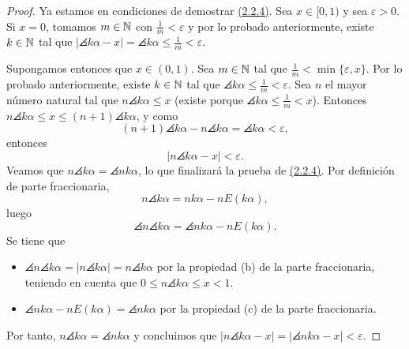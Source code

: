 \documentclass[a4paper, 12pt]{book}
\begin{document}
\begin{proof}
    Ya estamos en condiciones de demostrar \hyperref[2.2.4]{(2.2.4)}. Sea $x \in [0,1)$ y sea $\varepsilon > 0$. Si $x = 0$, tomamos $m \in \mathbb N$ con $\frac{1}{m}<\varepsilon$ y por lo probado anteriormente, existe $k \in \mathbb N$ tal que $|\angles{k\alpha}-x| = \angles{k\alpha}  \leq \frac{1}{m}< \varepsilon$.
    
    Supongamos entonces que $x \in (0,1)$. Sea $m \in \mathbb N$ tal que $\frac{1}{m} < \min\{\varepsilon,x\}$. Por lo probado anteriormente, existe $k \in \mathbb N$ tal que $\angles{k\alpha} \leq \frac{1}{m}< \varepsilon$.
    Sea $n$ el mayor número natural tal que $n \angles{k\alpha} \leq x$ (existe porque $\angles{k\alpha} \leq \frac{1}{m} < x$). Entonces $n \angles{k\alpha} \leq x \leq (n+1)\angles{k\alpha}$, y como
    \[(n+1)\angles{k\alpha} - n\angles{k\alpha} = \angles{k\alpha} < \varepsilon,\]
    entonces
    \[|n\angles{k\alpha}-x| < \varepsilon.\]
    Veamos que $n\angles{k\alpha} = \angles{nk\alpha}$, lo que finalizará la prueba de \hyperref[2.2.4]{(2.2.4)}. Por definición de parte fraccionaria,
    \[n\angles{k\alpha} = nk\alpha-nE( k\alpha ),\]
    luego 
    \[\angles{n\angles{k\alpha}} = \angles{nk\alpha-nE( k\alpha)}.\]
    Se tiene que
    \begin{itemize}
        \item $\angles{n\angles{k\alpha}} = |n\angles{k\alpha}| = n\angles{k\alpha}$ por la propiedad (b) de la parte fraccionaria, teniendo en cuenta que $0 \leq n\angles{k\alpha} \leq x < 1$.
        \item $\angles{nk\alpha-nE( k\alpha )} = \angles{nk\alpha}$ por la propiedad (c) de la parte fraccionaria.
    \end{itemize}
    Por tanto, $n\angles{k\alpha} = \angles{nk\alpha}$ y concluimos que $|n\angles{k\alpha}-x| = |\angles{nk\alpha}-x|<\varepsilon$.
\end{proof}
\end{document}
